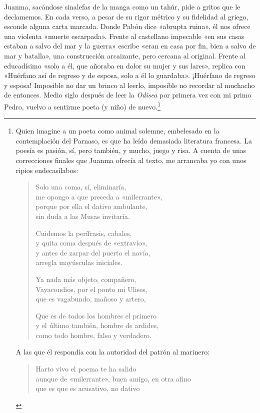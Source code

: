 \documentclass[11pt,a4paper]{article}
\begin{document}
Juanma, sacándose sinalefas de la manga como un tahúr, pide a gritos que le declamemos. En cada verso, a pesar de su rigor métrico y su fidelidad al griego, esconde alguna carta marcada. Donde Pabón dice «abrupta ruina», él nos ofrece una violenta «muerte escarpada». Frente al castellano impecable «en sus casas estaban a salvo del mar y la guerra» escribe «eran en casa por fin, bien a salvo de mar y batalla», una construcción arcaizante, pero cercana al original. Frente al educadísimo «solo a él, que añoraba en dolor su mujer y sus lares», replica con «Huérfano así de regreso y de esposa, solo a él lo guardaba». ¡Huérfano de regreso y esposa! Imposible no dar un brinco al leerlo, imposible no recordar al muchacho de entonces. Medio siglo después de leer la \emph{Odisea} por primera vez con mi primo Pedro, vuelvo a sentirme poeta (y niño) de nuevo.\footnote{Quien imagine a un poeta como animal solemne, embelesado en la contemplación del Parnaso, es que ha leído demasiada literatura francesa. La poesía es pasión, sí, pero también, y mucho, juego y risa. A cuenta de unas correcciones finales que Juanma ofrecía al texto, me arrancaba yo con unos ripios endecasílabos: 

\begin{verse}
Solo una coma, sí, eliminaría,\\
me opongo a que preceda a «milerrante»,\\
porque por ella el dativo ambulante,\\
sin duda a las Musas invitaría.

Cuidemos la perífrasis, cabales,\\
y quita coma después de «extravío»,\\
y antes de zarpar del puerto el navío,\\
arregla mayúsculas iniciales.

Ya nada más objeto, compañero,\\
Vayacondios, por el ponto mi Ulises,\\
que es vagabundo, mañoso y artero,

Que es de todos los hombres el primero\\
y el último también, hombre de ardides,\\
como todo hombre, falso y verdadero.
\end{verse}

A las que él respondía con la autoridad del patrón al marinero:

\begin{verse}
Harto vivo el poema te ha salido\\
aunque de «milerrante», buen amigo, en otra afino\\
que es que es acusativo, no dativo
\end{verse}}
\end{document}
